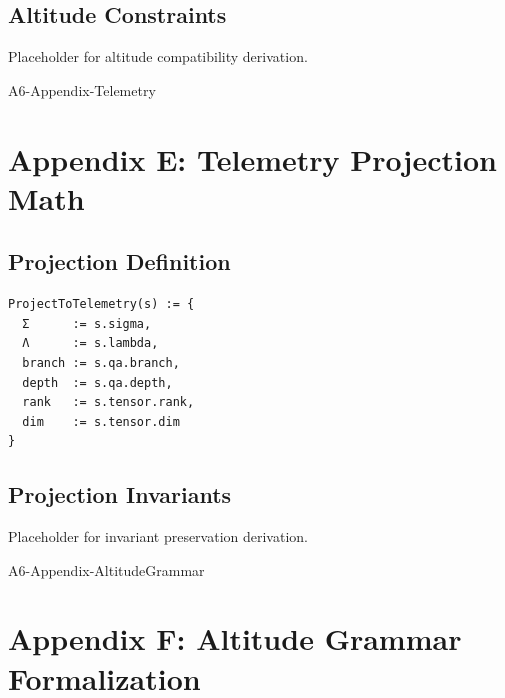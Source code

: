 \documentclass[11pt]{article}
\begin{document}
\subsection{Altitude Constraints}
Placeholder for altitude compatibility derivation.

\newpage


\begin{citationmembrane}{A6-Appendix-Telemetry}
\end{citationmembrane}

\section{Appendix E: Telemetry Projection Math}

\subsection{Projection Definition}
\begin{verbatim}
ProjectToTelemetry(s) := {
  Σ      := s.sigma,
  Λ      := s.lambda,
  branch := s.qa.branch,
  depth  := s.qa.depth,
  rank   := s.tensor.rank,
  dim    := s.tensor.dim
}
\end{verbatim}

\subsection{Projection Invariants}
Placeholder for invariant preservation derivation.

\newpage


\begin{citationmembrane}{A6-Appendix-AltitudeGrammar}
\end{citationmembrane}

\section{Appendix F: Altitude Grammar Formalization}
\end{document}

